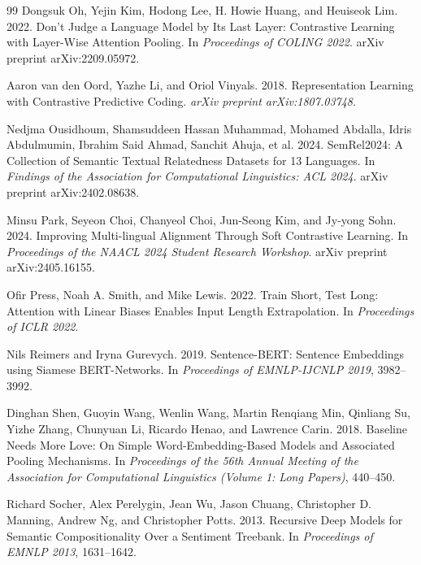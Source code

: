 \documentclass[manuscript]{acmart}
\begin{document}
\begin{thebibliography}{99}
Dongsuk Oh, Yejin Kim, Hodong Lee, H. Howie Huang, and Heuiseok Lim. 2022.
\newblock Don't Judge a Language Model by Its Last Layer: Contrastive Learning with Layer-Wise Attention Pooling.
\newblock In \emph{Proceedings of COLING 2022}. arXiv preprint arXiv:2209.05972.

Aaron van den Oord, Yazhe Li, and Oriol Vinyals. 2018.
\newblock Representation Learning with Contrastive Predictive Coding.
\newblock \emph{arXiv preprint arXiv:1807.03748}.

Nedjma Ousidhoum, Shamsuddeen Hassan Muhammad, Mohamed Abdalla, Idris Abdulmumin, Ibrahim Said Ahmad, Sanchit Ahuja, et al. 2024.
\newblock SemRel2024: A Collection of Semantic Textual Relatedness Datasets for 13 Languages.
\newblock In \emph{Findings of the Association for Computational Linguistics: ACL 2024}. arXiv preprint arXiv:2402.08638.

Minsu Park, Seyeon Choi, Chanyeol Choi, Jun-Seong Kim, and Jy-yong Sohn. 2024.
\newblock Improving Multi-lingual Alignment Through Soft Contrastive Learning.
\newblock In \emph{Proceedings of the NAACL 2024 Student Research Workshop}. arXiv preprint arXiv:2405.16155.

Ofir Press, Noah A. Smith, and Mike Lewis. 2022.
\newblock Train Short, Test Long: Attention with Linear Biases Enables Input Length Extrapolation.
\newblock In \emph{Proceedings of ICLR 2022}.

Nils Reimers and Iryna Gurevych. 2019.
\newblock Sentence-BERT: Sentence Embeddings using Siamese BERT-Networks.
\newblock In \emph{Proceedings of EMNLP-IJCNLP 2019}, 3982--3992.

Dinghan Shen, Guoyin Wang, Wenlin Wang, Martin Renqiang Min, Qinliang Su, Yizhe Zhang, Chunyuan Li, Ricardo Henao, and Lawrence Carin. 2018.
\newblock Baseline Needs More Love: On Simple Word-Embedding-Based Models and Associated Pooling Mechanisms.
\newblock In \emph{Proceedings of the 56th Annual Meeting of the Association for Computational Linguistics (Volume 1: Long Papers)}, 440--450.

Richard Socher, Alex Perelygin, Jean Wu, Jason Chuang, Christopher D. Manning, Andrew Ng, and Christopher Potts. 2013.
\newblock Recursive Deep Models for Semantic Compositionality Over a Sentiment Treebank.
\newblock In \emph{Proceedings of EMNLP 2013}, 1631--1642.


\end{thebibliography}
\end{document}
